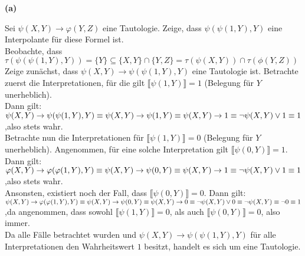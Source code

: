 \documentclass[11pt, a4paper]{article}
\begin{document}
\textbf{(a)}
\begin{adjustwidth}{20pt}{20pt}
Sei $\psi(X,Y) \rightarrow \varphi(Y,Z)$ eine Tautologie. Zeige, dass $\psi(\psi(1,Y),Y)$ eine Interpolante für diese Formel ist.\\

Beobachte, dass $\tau(\psi(\psi(1,Y),Y))=\{Y\} \subseteq \{X,Y\}\cap \{Y,Z\} = \tau(\psi(X,Y))\cap \tau(\phi(Y,Z))$\\

Zeige zunächst, dass $\psi(X,Y) \rightarrow \psi(\psi(1,Y),Y)$ eine Tautologie ist. Betrachte zuerst die Interpretationen, für die gilt $\llbracket \psi(1,Y) \rrbracket=1$ (Belegung für $Y$ unerheblich).\\

Dann gilt:\\
 $\psi(X,Y) \rightarrow \psi(\psi(1,Y),Y)\\ \equiv \psi(X,Y) \rightarrow \psi(1,Y)\\ \equiv \psi(X,Y) \rightarrow 1 \equiv \neg \psi(X,Y) \vee 1 \equiv 1$ \qquad ,also stets wahr.\\
 
 Betrachte nun die Interpretationen für $\llbracket \psi(1,Y) \rrbracket=0$ (Belegung für $Y$ unerheblich). Angenommen, für eine solche Interpretation gilt $\llbracket \psi(0,Y) \rrbracket=1$. Dann gilt:\\
 $\varphi(X,Y) \rightarrow \varphi(\varphi(1,Y),Y)\\ \equiv \psi(X,Y) \rightarrow \psi(0,Y)\\ \equiv \psi(X,Y) \rightarrow 1 \equiv \neg \psi(X,Y) \vee 1 \equiv 1$ \qquad ,also stets wahr.\\
 
 Ansonsten, existiert noch der Fall, dass $\llbracket \psi(0,Y) \rrbracket=0$. Dann gilt:\\
 
$\psi(X,Y) \rightarrow \varphi(\varphi(1,Y),Y)\\ \equiv \psi(X,Y) \rightarrow \psi(0,Y)\\ \equiv \psi(X,Y) \rightarrow 0 \equiv \neg \psi(X,Y) \vee 0 \equiv \neg \psi(X,Y) \equiv \neg 0 \equiv 1$ \qquad ,da angenommen, dass sowohl $\llbracket \psi(1,Y) \rrbracket=0$, als auch $\llbracket \psi(0,Y) \rrbracket=0$, also immer.\\

Da alle Fälle betrachtet wurden und $\psi(X,Y) \rightarrow \psi(\psi(1,Y),Y)$ für alle Interpretationen den Wahrheitswert $1$ besitzt, handelt es sich um eine Tautologie.\\


\end{adjustwidth}
\end{document}
